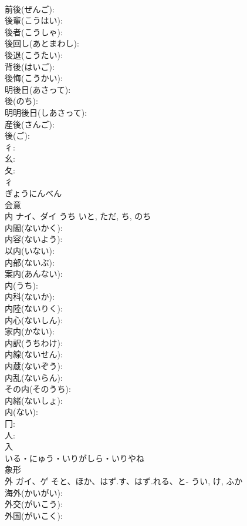 \documentclass[8pt]{extreport}
\begin{document}
\begin{CJK}{UTF8}{min}
\\	前後(ぜんご): 
\\	後輩(こうはい): 
\\	後者(こうしゃ): 
\\	後回し(あとまわし): 
\\	後退(こうたい): 
\\	背後(はいご): 
\\	後悔(こうかい): 
\\	明後日(あさって): 
\\	後(のち): 
\\	明明後日(しあさって): 
\\	産後(さんご): 
\\	後(ご): 
\\	彳: 
\\	幺: 
\\	夂: 
\\	彳	
\\	ぎょうにんべん	
\\	会意 
\\	内	ナイ、ダイ	うち	いと, ただ, ち, のち	
\\	内閣(ないかく): 
\\	内容(ないよう): 
\\	以内(いない): 
\\	内部(ないぶ): 
\\	案内(あんない): 
\\	内(うち): 
\\	内科(ないか): 
\\	内陸(ないりく): 
\\	内心(ないしん): 
\\	家内(かない): 
\\	内訳(うちわけ): 
\\	内線(ないせん): 
\\	内蔵(ないぞう): 
\\	内乱(ないらん): 
\\	その内(そのうち): 
\\	内緒(ないしょ): 
\\	内(ない): 
\\	冂: 
\\	人: 
\\	入	
\\	いる・にゅう・いりがしら・いりやね	
\\	象形 
\\	外	ガイ、ゲ	そと、ほか、はず.す、はず.れる、と-	うい, け, ふか	
\\	海外(かいがい): 
\\	外交(がいこう): 
\\	外国(がいこく): 

\end{CJK}
\end{document}
